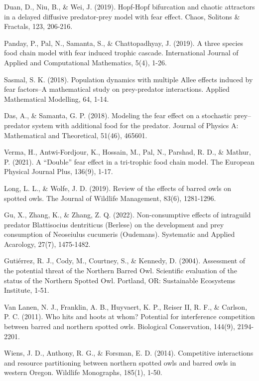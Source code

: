 \documentclass[10pt]{amsart}
\theoremstyle{definition}
\begin{document}
\begin{thebibliography}{}
 Duan, D., Niu, B., \& Wei, J. (2019). Hopf-Hopf bifurcation and chaotic attractors in a delayed diffusive predator-prey model with fear effect. Chaos, Solitons \& Fractals, 123, 206-216.

 Panday, P., Pal, N., Samanta, S., \& Chattopadhyay, J. (2019). A three species food chain model with fear induced trophic cascade. International Journal of Applied and Computational Mathematics, 5(4), 1-26.

 Sasmal, S. K. (2018). Population dynamics with multiple Allee effects induced by fear factors–A mathematical study on prey-predator interactions. Applied Mathematical Modelling, 64, 1-14.

 Das, A., \& Samanta, G. P. (2018). Modeling the fear effect on a stochastic prey–predator system with additional food for the predator. Journal of Physics A: Mathematical and Theoretical, 51(46), 465601.

 Verma, H., Antwi-Fordjour, K., Hossain, M., Pal, N., Parshad, R. D., \& Mathur, P. (2021). A “Double” fear effect in a tri-trophic food chain model. The European Physical Journal Plus, 136(9), 1-17.

Long, L. L., \& Wolfe, J. D. (2019). Review of the effects of barred owls on spotted owls. The Journal of Wildlife Management, 83(6), 1281-1296.

Gu, X., Zhang, K., \& Zhang, Z. Q. (2022). Non-consumptive effects of intraguild predator Blattisocius dentriticus (Berlese) on the development and prey consumption of Neoseiulus cucumeris (Oudemans). Systematic and Applied Acarology, 27(7), 1475-1482.

Gutiérrez, R. J., Cody, M., Courtney, S., \& Kennedy, D. (2004). Assessment of the potential threat of the Northern Barred Owl. Scientific evaluation of the status of the Northern Spotted Owl. Portland, OR: Sustainable Ecosystems Institute, 1-51.

Van Lanen, N. J., Franklin, A. B., Huyvaert, K. P., Reiser II, R. F., \& Carlson, P. C. (2011). Who hits and hoots at whom? Potential for interference competition between barred and northern spotted owls. Biological Conservation, 144(9), 2194-2201.

Wiens, J. D., Anthony, R. G., \& Forsman, E. D. (2014). Competitive interactions and resource partitioning between northern spotted owls and barred owls in western Oregon. Wildlife Monographs, 185(1), 1-50.


\end{thebibliography}
\end{document}
